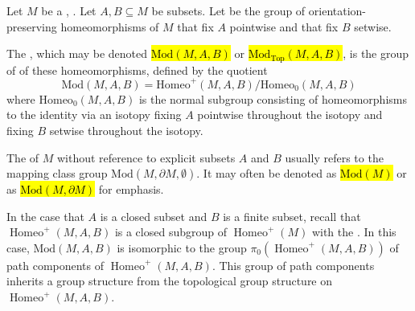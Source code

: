 \begin{definition} \label{definition:mapping_class_group_of_a_connected_oriented_topological_manifold_with_or_without_boundary_relative_to_subsets}
Let $M$ be a ,  . Let $A,B \subseteq M$ be subsets. Let  be the group of orientation-preserving homeomorphisms of $M$ that fix $A$ pointwise and that fix $B$ setwise.

The , which may be denoted \hl{$\text{Mod}(M, A, B)$} or \hl{$\text{Mod}_{\text{Top}}(M, A, B)$}, is the group of  of these homeomorphisms, defined by the quotient
$$\text{Mod}(M, A, B) = \text{Homeo}^{+}(M, A, B) / \text{Homeo}_{0}(M, A, B)$$
where $\text{Homeo}_{0}(M, A, B)$ is the normal subgroup consisting of homeomorphisms  to the identity via an isotopy fixing $A$ pointwise throughout the isotopy and fixing $B$ setwise throughout the isotopy.


The  of $M$ without reference to explicit subsets $A$ and $B$ usually refers to the mapping class group $\text{Mod}(M, \partial M, \emptyset)$. It may often be denoted as \hl{$\text{Mod}(M)$} or as \hl{$\text{Mod}(M, \partial M)$} for emphasis.

In the case that $A$ is a closed subset and $B$ is a finite subset, recall that $\operatorname{Homeo}^+(M,A,B)$ is a closed subgroup of $\operatorname{Homeo}^+(M)$ with the . In this case, $\text{Mod}(M,A,B)$ is isomorphic to the group $\pi_0(\operatorname{Homeo}^+(M, A,B))$ of path components of $\operatorname{Homeo}^+(M, A,B)$. This group of path components inherits a group structure from the topological group structure on $\operatorname{Homeo}^+(M, A, B)$. 
\end{definition}